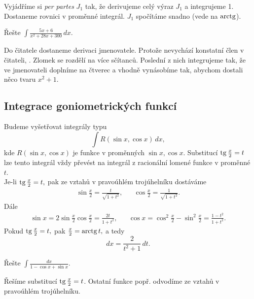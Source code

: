 \begin{reseni}
Vyjádříme si \textit{per partes} $J_1$ tak, že derivujeme celý výraz $J_1$ a integrujeme
1. Dostaneme rovnici v proměnné integrál. $J_1$ spočítáme snadno (vede na $\operatorname{arctg}$).
\end{reseni}

\begin{priklad}
Řešte $\int \frac{5x+6}{x^2+28x+300}\, dx.$
\end{priklad}

\begin{reseni}
Do čitatele dostaneme derivaci jmenovatele. Protože nevychází konstatní člen
v čitateli, . Zlomek se rozdělí na více sčítanců.
Poslední z nich integrujeme tak, že ve jmenovateli doplníme na čtverec a vhodně vynásobíme
tak, abychom dostali něco tvaru $x^2+1$.
\end{reseni}


\subsection*{Integrace goniometrických funkcí}
\begin{pozn}
    Budeme vyšetřovat integrály typu
    $$\int R(\sin x, \cos x) \, dx,$$
    kde $R(\sin x, \cos x)$ je funkce v proměnných $\sin x, \cos x.$ Substitucí
    $\operatorname{tg} \frac{x}{2}=t$ lze tento integrál vždy převést na integrál z racionální
    lomené funkce v proměnné $t$. \\
    Je-li $\operatorname{tg} \frac{x}{2}=t,$ pak ze vztahů v pravoúhlém trojúhelníku dostáváme
    \begin{align*}
        \sin \frac{x}{2}=\frac{t}{\sqrt{1+t^2} }, & & \cos \frac{x}{2}=\frac{1}{\sqrt{1+t^2} }.
    \end{align*}
    Dále
    \begin{align*}
        \sin x = 2\sin \frac{x}{2}\cos \frac{x}{2}=\frac{2t}{1+t^2}, & &
        \cos x = \cos^2 \frac{x}{2}-\sin^2 \frac{x}{2}=\frac{1-t^2}{1+t^2}.
    \end{align*}
    Pokud $\operatorname{tg} \frac{x}{2}=t,$ pak $\frac{x}{2}=\operatorname{arctg} t,$ a tedy
    $$dx = \frac{2}{t^2+1}\, dt.$$
\end{pozn}

\begin{priklad}
Řešte $\int \frac{dx}{1-\cos x+\sin x}$.
\end{priklad}

\begin{reseni}
Řešíme substitucí $\operatorname{tg} \frac{x}{2}=t$. Ostatní funkce popř. odvodíme ze vztahů
v pravoúhlém trojúhelníku.
\end{reseni}

